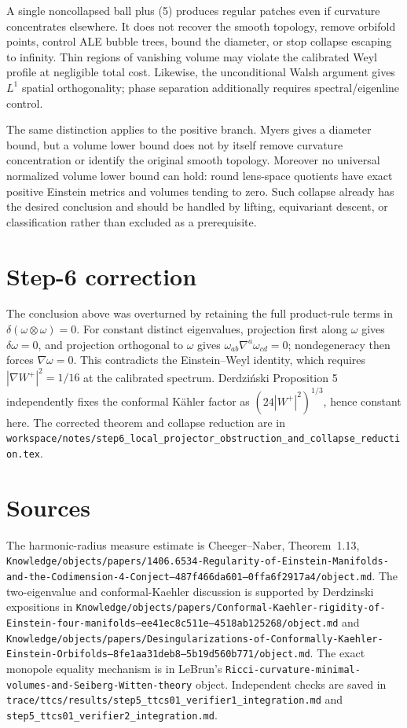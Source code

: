 A single noncollapsed ball plus (5) produces regular patches even if
curvature concentrates elsewhere.  It does not recover the smooth topology,
remove orbifold points, control ALE bubble trees, bound the diameter, or stop
collapse escaping to infinity.  Thin regions of vanishing volume may violate
the calibrated Weyl profile at negligible total cost.  Likewise, the
unconditional Walsh argument gives $L^1$ spatial orthogonality; phase
separation additionally requires spectral/eigenline control.

The same distinction applies to the positive branch.  Myers gives a diameter
bound, but a volume lower bound does not by itself remove curvature
concentration or identify the original smooth topology.  Moreover no
universal normalized volume lower bound can hold: round lens-space quotients
have exact positive Einstein metrics and volumes tending to zero.  Such
collapse already has the desired conclusion and should be handled by lifting,
equivariant descent, or classification rather than excluded as a prerequisite.

\section{Step-6 correction}
The conclusion above was overturned by retaining the full product-rule terms in
$\delta(\omega\otimes\omega)=0$.  For constant distinct eigenvalues, projection
first along $\omega$ gives $\delta\omega=0$, and projection orthogonal to
$\omega$ gives $\omega_{ab}\nabla^a\omega_{cd}=0$; nondegeneracy then forces
$\nabla\omega=0$.  This contradicts the Einstein--Weyl identity, which requires
$|\nabla W^+|^2=1/16$ at the calibrated spectrum.  Derdzi\'nski Proposition 5
independently fixes the conformal K\"ahler factor as $(24|W^+|^2)^{1/3}$, hence
constant here.  The corrected theorem and collapse reduction are in
\texttt{workspace/notes/step6\_local\_projector\_obstruction\_and\_collapse\_reduction.tex}.

\section{Sources}
The harmonic-radius measure estimate is Cheeger--Naber, Theorem~1.13,
\texttt{Knowledge/objects/papers/1406.6534-Regularity-of-Einstein-Manifolds-and-the-Codimension-4-Conject--487f466da601--0ffa6f2917a4/object.md}.
The two-eigenvalue and conformal-Kaehler discussion is supported by
Derdzinski expositions in
\texttt{Knowledge/objects/papers/Conformal-Kaehler-rigidity-of-Einstein-four-manifolds--ee41ec8c511e--4518ab125268/object.md}
and
\texttt{Knowledge/objects/papers/Desingularizations-of-Conformally-Kaehler-Einstein-Orbifolds--8fe1aa31deb8--5b19d560b771/object.md}.
The exact monopole equality mechanism is in LeBrun's
\texttt{Ricci-curvature-minimal-volumes-and-Seiberg-Witten-theory} object.
Independent checks are saved in
\texttt{trace/ttcs/results/step5\_ttcs01\_verifier1\_integration.md} and
\texttt{step5\_ttcs01\_verifier2\_integration.md}.
